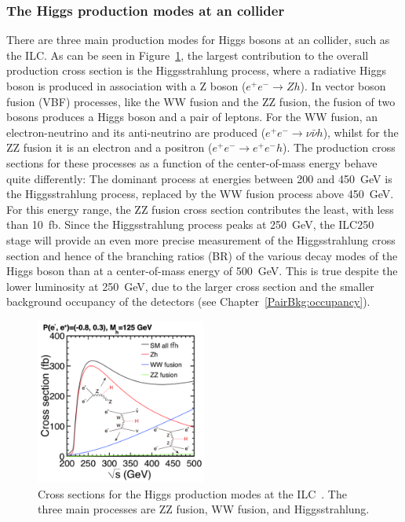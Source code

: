 \subsubsection{The Higgs production modes at an \positron\electron collider}
There are three main production modes for Higgs bosons at an \positron\electron collider, such as the ILC.
As can be seen in Figure~\ref{fig:HiggsProduction}, the largest contribution to the overall production cross section is the Higgsstrahlung process, where a radiative Higgs boson is produced in association with a Z boson ($e^+e^-\rightarrow Zh$).
In vector boson fusion (VBF) processes, like the WW fusion and the ZZ fusion, the fusion of two bosons produces a Higgs boson and a pair of leptons.
For the WW fusion, an electron-neutrino and its anti-neutrino are produced ($e^+e^-\rightarrow \nu\bar{\nu} h$), whilst for the ZZ fusion it is an electron and a positron ($e^+e^-\rightarrow e^+e^-h$).
The production cross sections for these processes as a function of the center-of-mass energy behave quite differently:
The dominant process at energies between 200 and \SI{450}{\GeV} is the Higgsstrahlung process, replaced by the WW fusion process above \SI{450}{\GeV}.
For this energy range, the ZZ fusion cross section contributes the least, with less than \SI{10}{fb}.
Since the Higgsstrahlung process peaks at \SI{250}{\GeV}, the ILC250 stage will provide an even more precise measurement of the Higgsstrahlung cross section and hence of the branching ratios (BR) of the various decay modes of the Higgs boson than at a center-of-mass energy of \SI{500}{\GeV}.
This is true despite the lower luminosity at \SI{250}{\GeV}, due to the larger cross section and the smaller background occupancy of the detectors (see Chapter~\ref{PairBkg:occupancy}).
\begin{figure}
\centering
\includegraphics[width=0.5\textwidth]{Figures/HiggsProductionCrossSection.png}
\caption[Cross section for the Higgs production modes at ILC]{Cross sections for the Higgs production modes at the ILC~\cite[p. 13]{PhysicsCase}.
The three main processes are ZZ fusion, WW fusion, and Higgsstrahlung.}
\label{fig:HiggsProduction}
\end{figure}

